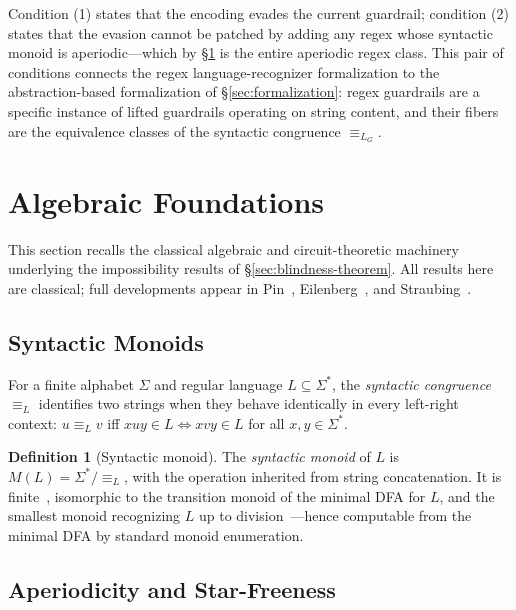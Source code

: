 \documentclass[letterpaper,twocolumn,10pt]{article}
\theoremstyle{definition}
\newtheorem{definition}[theorem]{Definition}
\theoremstyle{remark}
\begin{document}
Condition (1) states that the encoding evades the current guardrail; condition (2)
states that the evasion cannot be patched by adding any regex whose syntactic monoid
is aperiodic---which by \S\ref{sec:algebraic-foundations} is the entire aperiodic
regex class.
This pair of conditions connects the regex language-recognizer formalization to the
abstraction-based formalization of \S\ref{sec:formalization}: regex guardrails are
a specific instance of lifted guardrails operating on string content, and their
fibers are the equivalence classes of the syntactic congruence $\equiv_{L_G}$.

\section{Algebraic Foundations}\label{sec:algebraic-foundations}

This section recalls the classical algebraic and circuit-theoretic machinery
underlying the impossibility results of \S\ref{sec:blindness-theorem}.
All results here are classical; full developments appear in
Pin~\cite{pin1986}, Eilenberg~\cite{eilenberg1976}, and
Straubing~\cite{straubing1994}.

\subsection{Syntactic Monoids}\label{sec:syntactic-monoids}

For a finite alphabet $\Sigma$ and regular language $L \subseteq \Sigma^*$,
the \emph{syntactic congruence} $\equiv_L$ identifies two strings when they
behave identically in every left-right context: $u \equiv_L v$ iff
$xuy \in L \Leftrightarrow xvy \in L$ for all $x, y \in \Sigma^*$.

\begin{definition}[Syntactic monoid]\label{def:syntactic-monoid}
The \emph{syntactic monoid} of $L$ is $M(L) = \Sigma^* / {\equiv_L}$, with the
operation inherited from string concatenation.
It is finite~\cite{myhill1957,nerode1958}, isomorphic to the transition monoid
of the minimal DFA for $L$, and the smallest monoid recognizing $L$ up to
division~\cite{pin1986,eilenberg1976}---hence computable from the minimal DFA
by standard monoid enumeration.
\end{definition}

\subsection{Aperiodicity and Star-Freeness}\label{sec:aperiodicity}
\end{document}
